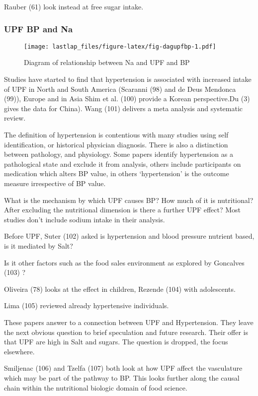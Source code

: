 \documentclass[
]{article}
\begin{document}
Rauber (61) look instead at free sugar intake.

\hypertarget{upf-bp-and-na}{%
\subsubsection{UPF BP and Na}\label{upf-bp-and-na}}

\begin{figure}
\centering
\texttt{[image: lastlap\_files/figure-latex/fig-dagupfbp-1.pdf]}
\caption{Diagram of relationship between Na and UPF and BP}
\end{figure}

Studies have started to find that hypertension is associated with
increased intake of UPF in North and South America (Scaranni (98) and de
Deus Mendonca (99)), Europe and in Asia Shim et al. (100) provide a
Korean perspective.Du (3) gives the data for China). Wang (101) delivers
a meta analysis and systematic review.

The definition of hypertension is contentious with many studies using
self identification, or historical physician diagnosis. There is also a
distinction between pathology, and physiology. Some papers identify
hypertension as a pathological state and exclude it from analysis,
others include participants on medication which alters BP value, in
others `hypertension' is the outcome measure irrespective of BP value.

What is the mechanism by which UPF causes BP? How much of it is
nutritional? After excluding the nutritional dimension is there a
further UPF effect? Most studies don't include sodium intake in their
analysis.

Before UPF, Suter (102) asked is hypertension and blood pressure
nutrient based, is it mediated by Salt?

Is it other factors such as the food sales environment as explored by
Goncalves (103) ?

Oliveira (78) looks at the effect in children, Rezende (104) with
adolescents.

Lima (105) reviewed already hypertensive individuals.

These papers answer to a connection between UPF and Hypertension. They
leave the next obvious question to brief speculation and future
research. Their offer is that UPF are high in Salt and sugars. The
question is dropped, the focus elsewhere.

Smiljenac (106) and Tzelfa (107) both look at how UPF affect the
vasculature which may be part of the pathway to BP. This looks further
along the causal chain within the nutritional biologic domain of food
science.
\end{document}
